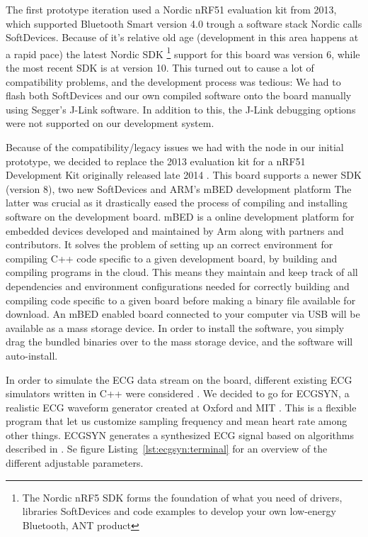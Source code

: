 The first prototype iteration used a Nordic nRF51 evaluation kit from 2013, which supported Bluetooth Smart version 4.0 trough a software stack Nordic calls SoftDevices. Because of it's relative old age (development in this area happens at a rapid pace) the latest Nordic SDK \footnote{The Nordic nRF5 SDK forms the foundation of what you need of drivers, libraries SoftDevices and code examples to develop your own low-energy Bluetooth, ANT product} support for this board was version 6, while the most recent SDK is at version 10. This turned out to cause a lot of compatibility problems, and the development process was tedious: We had to flash both SoftDevices and our own compiled software onto the board manually using Segger's J-Link software. In addition to this, the J-Link debugging options were not supported on our development system.

Because of the compatibility/legacy issues we had with the node in our initial prototype, we decided to replace the 2013 evaluation kit for a nRF51 Development Kit originally released late 2014 \cite{newRef:53}. This board supports a newer SDK (version 8), two new SoftDevices and ARM's mBED development platform \cite{newRef:54} The latter was crucial as it drastically eased the process of compiling and installing software on the development board. mBED is a online development platform for embedded devices developed and maintained by Arm \cite{newRef:55} along with partners and contributors. It solves the problem of setting up an correct environment for compiling C++ code specific to a given development board, by building and compiling programs in the cloud. This means they maintain and keep track of all dependencies and environment configurations needed for correctly building and compiling code specific to a given board before making a binary file available for download. An mBED enabled board connected to your computer via USB will be available as a mass storage device. In order to install the software, you simply drag the bundled binaries over to the mass storage device, and the software will auto-install. 

In order to simulate the ECG data stream on the board, different existing ECG simulators written in C++ were considered \cite{newRef:56, newRef:56:1, newRef:56:2}. We decided to go for ECGSYN, a realistic ECG waveform generator created at Oxford and MIT \cite{newRef:56:2}. This is a flexible program that let us customize sampling frequency and mean heart rate among other things. ECGSYN generates a synthesized ECG signal based on algorithms described in \cite{newRef:58}. Se figure Listing~\ref{lst:ecgsyn:terminal} for an overview of the different adjustable parameters.

